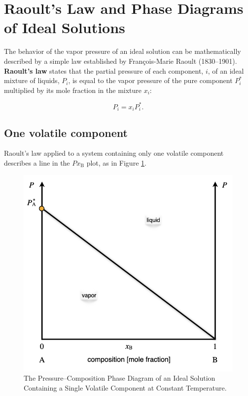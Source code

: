\documentclass[
  9pt,
]{extbook}
\theoremstyle{definition}
\theoremstyle{definition}
\theoremstyle{definition}
\theoremstyle{definition}
\theoremstyle{remark}
\begin{document}
\section{Raoult's Law and Phase Diagrams of Ideal Solutions}\label{raoults-law-and-phase-diagrams-of-ideal-solutions}

The behavior of the vapor pressure of an ideal solution can be mathematically described by a simple law established by François-Marie Raoult (1830--1901). \textbf{Raoult's law} states that the partial pressure of each component, \(i\), of an ideal mixture of liquids, \(P_i\), is equal to the vapor pressure of the pure component \(P_i^*\) multiplied by its mole fraction in the mixture \(x_i\):

\begin{equation}
P_i=x_i P_i^*.
\label{eq:mc1}
\end{equation}

\subsection{One volatile component}\label{one-volatile-component}

Raoult's law applied to a system containing only one volatile component describes a line in the \(Px_{\text{B}}\) plot, as in Figure \ref{fig:FigMC1}.

\begin{figure}

{\centering \includegraphics[width=0.6\linewidth]{./img/OEP_Figures.019} 

}

\caption{The Pressure–Composition Phase Diagram of an Ideal Solution Containing a Single Volatile Component at Constant Temperature.}\label{fig:FigMC1}
\end{figure}
\end{document}
